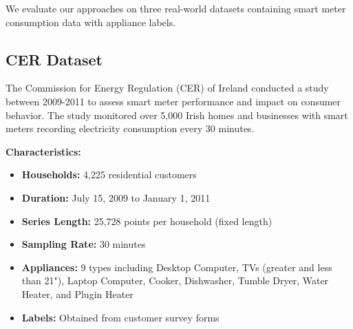 \documentclass[conference]{IEEEtran}
\begin{document}
We evaluate our approaches on three real-world datasets containing smart meter consumption data with appliance labels.

\subsection{CER Dataset}

The Commission for Energy Regulation (CER) of Ireland conducted a study between 2009-2011 to assess smart meter performance and impact on consumer behavior. The study monitored over 5,000 Irish homes and businesses with smart meters recording electricity consumption every 30 minutes.

\textbf{Characteristics:}
\begin{itemize}
    \item \textbf{Households:} 4,225 residential customers
    \item \textbf{Duration:} July 15, 2009 to January 1, 2011
    \item \textbf{Series Length:} 25,728 points per household (fixed length)
    \item \textbf{Sampling Rate:} 30 minutes
    \item \textbf{Appliances:} 9 types including Desktop Computer, TVs (greater and less than 21"), Laptop Computer, Cooker, Dishwasher, Tumble Dryer, Water Heater, and Plugin Heater
    \item \textbf{Labels:} Obtained from customer survey forms
\end{itemize}


\end{document}
